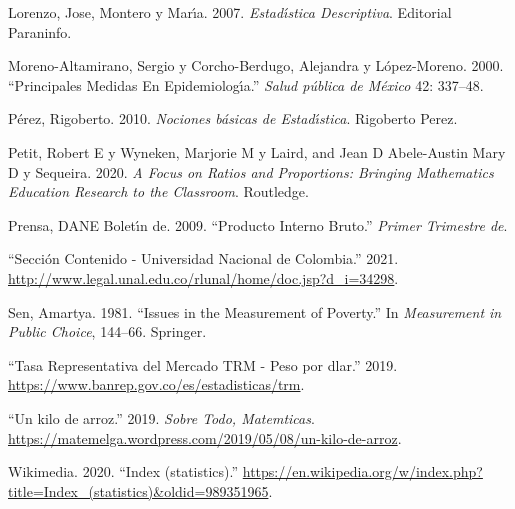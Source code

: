 \documentclass[
  11pt,
]{book}
\newlength{\cslhangindent}
\newlength{\cslentryspacingunit} %
\newenvironment{CSLReferences}[2] %
 {%
  \setlength{\parindent}{0pt}
  \ifodd #1
  \let\oldpar\par
  \def\par{\hangindent=\cslhangindent\oldpar}
  \fi
  \setlength{\parskip}{#2\cslentryspacingunit}
 }%
 {}
\begin{document}
\begin{CSLReferences}{1}{0}
\leavevmode{}%
Lorenzo, Jose, Montero y Marı́a. 2007. \emph{Estad{ı́}stica Descriptiva}. Editorial Paraninfo.

\leavevmode{}%
Moreno-Altamirano, Sergio y Corcho-Berdugo, Alejandra y López-Moreno. 2000. {``Principales Medidas En Epidemiolog{ı́}a.''} \emph{Salud p{ú}blica de M{é}xico} 42: 337--48.

\leavevmode{}%
Pérez, Rigoberto. 2010. \emph{Nociones b{á}sicas de Estad{ı́}stica}. Rigoberto Perez.

\leavevmode{}%
Petit, Robert E y Wyneken, Marjorie M y Laird, and Jean D Abele-Austin Mary D y Sequeira. 2020. \emph{A Focus on Ratios and Proportions: Bringing Mathematics Education Research to the Classroom}. Routledge.

\leavevmode{}%
Prensa, DANE Boletı́n de. 2009. {``Producto Interno Bruto.''} \emph{Primer Trimestre de}.

\leavevmode{}%
{``{Secci{ó}n Contenido - Universidad Nacional de Colombia}.''} 2021. \url{http://www.legal.unal.edu.co/rlunal/home/doc.jsp?d_i=34298}.

\leavevmode{}%
Sen, Amartya. 1981. {``Issues in the Measurement of Poverty.''} In \emph{Measurement in Public Choice}, 144--66. Springer.

\leavevmode{}%
{``{Tasa Representativa del Mercado TRM - Peso por d{\ifmmode{}\fi}lar}.''} 2019. \url{https://www.banrep.gov.co/es/estadisticas/trm}.

\leavevmode{}%
{``{Un kilo de arroz}.''} 2019. \emph{Sobre Todo, Matem{\a}ticas}. \url{https://matemelga.wordpress.com/2019/05/08/un-kilo-de-arroz}.

\leavevmode{}%
Wikimedia. 2020. {``{Index (statistics)}.''} \url{https://en.wikipedia.org/w/index.php?title=Index_(statistics)\&oldid=989351965}.

\end{CSLReferences}
\end{document}
